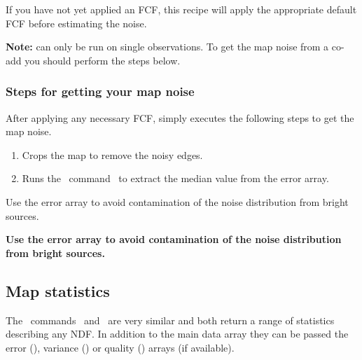 \documentclass[11pt,oneside,chapters]{starlink}
\begin{document}
\begin{terminalv}
\end{terminalv}
If you have not yet applied an FCF, this recipe will apply the
appropriate default FCF before estimating the noise.


\textbf{Note:}  can only be run on single
observations. To get the map noise from a co-add you should perform the steps below.


\subsubsection{Steps for getting your map noise}
After applying any necessary FCF,  simply
executes the following steps to get the map noise.

\begin{enumerate}
\item Crops the map to remove the noisy edges.
\begin{terminalv}
\end{terminalv}
\item Runs the \Kappa\ command \stats\ to extract the median value from
the error array.
\begin{terminalv}
\end{terminalv}
\end{enumerate}

\begin{tip}
Use the error array to avoid contamination of the noise
distribution from bright sources.

\vspace{0.1cm}
\end{tip}

\begin{htmlonly}
\textbf{Use the error array to avoid contamination of the noise
distribution from bright sources.}
\end{htmlonly}


\subsection{Map statistics}

The \Kappa\ commands \histat\ and \stats\ are very similar and both
return a range of statistics describing any NDF. In addition to the
main data array they can be passed the error (), variance
() or quality () arrays (if available).
\end{document}

